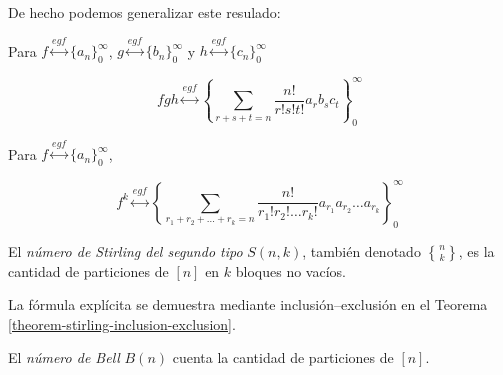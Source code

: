 De hecho podemos generalizar este resulado:
\begin{theorem}
\label{theorem-combi-003}
Para
$f
\overset{egf}{\longleftrightarrow}
\{a_n\}_0^\infty$,
$g
\overset{egf}{\longleftrightarrow}
\{b_n\}_0^\infty$
y
$h
\overset{egf}{\longleftrightarrow}
\{c_n\}_0^\infty$

$$
fgh
\overset{egf}{\longleftrightarrow} \left\{
\sum_{r + s + t = n}
\frac{n!}{r!s!t!}a_rb_sc_t \right\}_0^\infty
$$

\end{theorem}
\begin{theorem}
\label{theorem-combi-004}
Para
$f
\overset{egf}{\longleftrightarrow}
\{a_n\}_0^\infty$,

$$
f^k
\overset{egf}{\longleftrightarrow} \left\{
\sum_{r_1 + r_2 +  \ldots + r_k = n}
\frac{n!}{r_1!r_2! \ldots r_k!}a_{r_1}a_{r_2}
\ldots a_{r_k} \right\}_0^\infty
$$

\end{theorem}
\begin{definition}
\label{definition-combi-009}
El \emph{número de Stirling del segundo tipo}
$S(n,k)$, también denotado
$\genfrac{\{}{\}}{0pt}{}{n}{k}$, es la
cantidad de particiones de $[n]$ en $k$
bloques no vacíos.
\end{definition}
La fórmula explícita se demuestra mediante
inclusión--exclusión en el Teorema
\ref{theorem-stirling-inclusion-exclusion}.
\begin{definition}
\label{definition-combi-010}
El \emph{número de Bell} $B(n)$ cuenta la
cantidad de particiones de $[n]$.
\end{definition}
